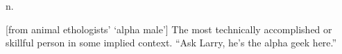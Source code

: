  n.

[from animal ethologists' `alpha male'] The most technically accomplished or skillful person in some implied context. ``Ask Larry, he's the
alpha geek here.''

